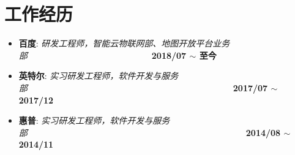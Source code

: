\documentclass[letterpaper, UTF8, 11pt]{article}
\begin{document}
	\section*{\textbf{工作经历}}\vspace{-0.12in}
	\begin{itemize}
		\item \textbf{百度}: \emph{研发工程师，智能云物联网部、地图开放平台业务部}~~~~~~~~~~~~~~~~~~~~~~~~~~~~~\textbf{2018/07 $\sim$ 至今}
		\item \textbf{英特尔}: \emph{实习研发工程师，软件开发与服务部}~~~~~~~~~~~~~~~~~~~~~~~~~~~~~~~~~~~~~~~~~~~~~~~~\textbf{2017/07 $\sim$ 2017/12}
		\item \textbf{惠普}: \emph{实习研发工程师，软件开发与服务部}~~~~~~~~~~~~~~~~~~~~~~~~~~~~~~~~~~~~~~~~~~~~~~~~~~~\textbf{2014/08 $\sim$ 2014/11}
	\end{itemize}
	\vspace{-0.32in}
	
\end{document}

